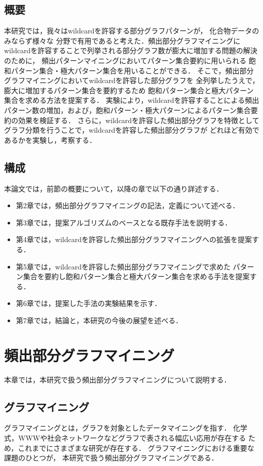 \documentclass[12pt,fleqn]{jsotsuron}
\begin{document}
\section{概要}
本研究では，我々はwildcardを許容する部分グラフパターンが，
化合物データのみならず様々な
分野で有用であると考えた．頻出部分グラフマイニングに
wildcardを許容することで列挙される部分グラフ数が膨大に増加する問題の解決のために，
頻出パターンマイニングにおいてパターン集合要約に用いられる
飽和パターン集合・極大パターン集合を用いることができる．
そこで，頻出部分グラフマイニングにおいてwildcardを許容した部分グラフを
全列挙したうえで，膨大に増加するパターン集合を要約するため
飽和パターン集合と極大パターン集合を求める方法を提案する．
実験により，wildcardを許容することによる頻出パターン数の増加，および，飽和パターン・極大パターンによるパターン集合要約の効果を検証する．
さらに，wildcardを許容した頻出部分グラフを特徴として
グラフ分類を行うことで，wildcardを許容した頻出部分グラフが
どれほど有効であるかを実験し，考察する．

\section{構成}
本論文では，前節の概要について，以降の章で以下の通り詳述する．
\begin{itemize}
\item 第2章では，頻出部分グラフマイニングの記法，定義について述べる．
\item 第3章では，提案アルゴリズムのベースとなる既存手法を説明する．
\item 第4章では，wildcardを許容した頻出部分グラフマイニングへの拡張を提案する．
\item 第5章では，wildcardを許容した頻出部分グラフマイニングで求めた
パターン集合を要約し飽和パターン集合と極大パターン集合を求める手法を提案する．
\item 第6章では，提案した手法の実験結果を示す．
\item 第7章では，結論と，本研究の今後の展望を述べる．
\end{itemize}


\chapter{頻出部分グラフマイニング}

本章では，本研究で扱う頻出部分グラフマイニングについて説明する．

\section{グラフマイニング}
グラフマイニングとは，グラフを対象としたデータマイニングを指す．
化学式，WWWや社会ネットワークなどグラフで表される幅広い応用が存在する
ため，これまでにさまざまな研究が存在する．
グラフマイニングにおける重要な課題のひとつが，
本研究で扱う頻出部分グラフマイニングである．
\end{document}

